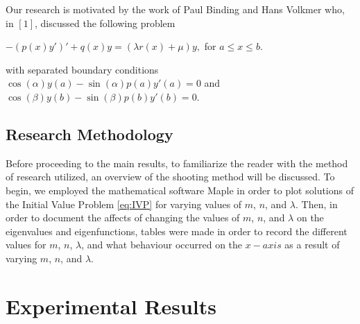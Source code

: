\documentclass[executivepaper]{article}
\begin{document}
\vspace{3mm}

Our research is motivated by the work of Paul Binding and Hans Volkmer who, in $[1]$, discussed the following problem

\vspace{3mm}

\begin{center}

$-(p(x)y')'+q(x)y=(\lambda r(x)+\mu)y,$ for $a \leq x \leq b$.

\end{center}

\pagebreak

\vspace*{-40mm}

with separated boundary conditions $\cos(\alpha)y(a)-\sin(\alpha)p(a)y'(a)=0$ and $\cos(\beta)y(b)-\sin(\beta)p(b)y'(b)=0$.

\vspace{3mm}

\begin{center}

\section*{Research Methodology}

\end{center}

Before proceeding to the main results, to familiarize the reader with the method of research utilized, an overview of the shooting method will be discussed. To begin, we employed the mathematical software Maple in order to plot solutions of the Initial Value Problem \eqref{eq:IVP} for varying values of $m$, $n$, and $\lambda$. Then, in order to document the affects of changing the values of $m$, $n$, and $\lambda$ on the eigenvalues and eigenfunctions, tables were made in order to record the different values for $m$, $n$, $\lambda$, and what behaviour occurred on the $x-axis$ as a result of varying $m$, $n$, and $\lambda$.

\vspace{3mm}

{\centering 

\section*{Experimental Results} \par

}
\end{document}
